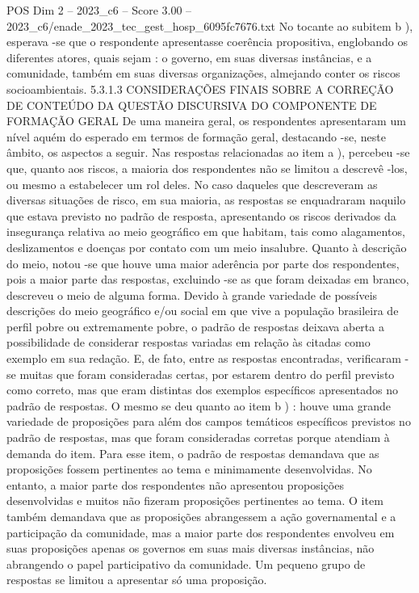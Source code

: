 \begin{textsample}{POS Dim 2 – 2023\_c6 – Score 3.00 – 2023\_c6/enade\_2023\_tec\_gest\_hosp\_6095fc7676.txt}
No tocante ao subitem b ), esperava -se que o respondente apresentasse coerência propositiva, englobando os diferentes atores, quais sejam : o governo, em suas diversas instâncias, e a comunidade, também em suas diversas organizações, almejando conter os riscos socioambientais. 5.3.1.3 CONSIDERAÇÕES FINAIS SOBRE A CORREÇÃO DE CONTEÚDO DA QUESTÃO DISCURSIVA DO COMPONENTE DE FORMAÇÃO GERAL De uma maneira geral, os respondentes apresentaram um nível aquém do esperado em termos de formação geral, destacando -se, neste âmbito, os aspectos a seguir.
Nas respostas relacionadas ao item a ), percebeu -se que, quanto aos riscos, a maioria dos respondentes não se limitou a descrevê -los, ou mesmo a estabelecer um rol deles.
No caso daqueles que descreveram as diversas situações de risco, em sua maioria, as respostas se enquadraram naquilo que estava previsto no padrão de resposta, apresentando os riscos derivados da insegurança relativa ao meio geográfico em que habitam, tais como alagamentos, deslizamentos e doenças por contato com um meio insalubre.
Quanto à descrição do meio, notou -se que houve uma maior aderência por parte dos respondentes, pois a maior parte das respostas, excluindo -se as que foram deixadas em branco, descreveu o meio de alguma forma.
Devido à grande variedade de possíveis descrições do meio geográfico e/ou social em que vive a população brasileira de perfil pobre ou extremamente pobre, o padrão de respostas deixava aberta a possibilidade de considerar respostas variadas em relação às citadas como exemplo em sua redação.
E, de fato, entre as respostas encontradas, verificaram -se muitas que foram consideradas certas, por estarem dentro do perfil previsto como correto, mas que eram distintas dos exemplos específicos apresentados no padrão de respostas.
O mesmo se deu quanto ao item b ) : houve uma grande variedade de proposições para além dos campos temáticos específicos previstos no padrão de respostas, mas que foram consideradas corretas porque atendiam à demanda do item.
Para esse item, o padrão de respostas demandava que as proposições fossem pertinentes ao tema e minimamente desenvolvidas.
No entanto, a maior parte dos respondentes não apresentou proposições desenvolvidas e muitos não fizeram proposições pertinentes ao tema.
O item também demandava que as proposições abrangessem a ação governamental e a participação da comunidade, mas a maior parte dos respondentes envolveu em suas proposições apenas os governos em suas mais diversas instâncias, não abrangendo o papel participativo da comunidade.
Um pequeno grupo de respostas se limitou a apresentar só uma proposição.

\end{textsample}
